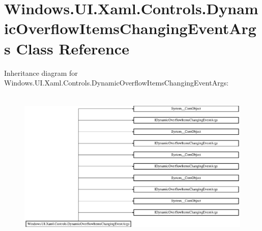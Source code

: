 \hypertarget{class_windows_1_1_u_i_1_1_xaml_1_1_controls_1_1_dynamic_overflow_items_changing_event_args}{}\section{Windows.\+U\+I.\+Xaml.\+Controls.\+Dynamic\+Overflow\+Items\+Changing\+Event\+Args Class Reference}
\label{class_windows_1_1_u_i_1_1_xaml_1_1_controls_1_1_dynamic_overflow_items_changing_event_args}
Inheritance diagram for Windows.\+U\+I.\+Xaml.\+Controls.\+Dynamic\+Overflow\+Items\+Changing\+Event\+Args\+:\begin{figure}[H]
\begin{center}
\leavevmode
\includegraphics[height=7.439613cm]{class_windows_1_1_u_i_1_1_xaml_1_1_controls_1_1_dynamic_overflow_items_changing_event_args}
\end{center}
\end{figure}
